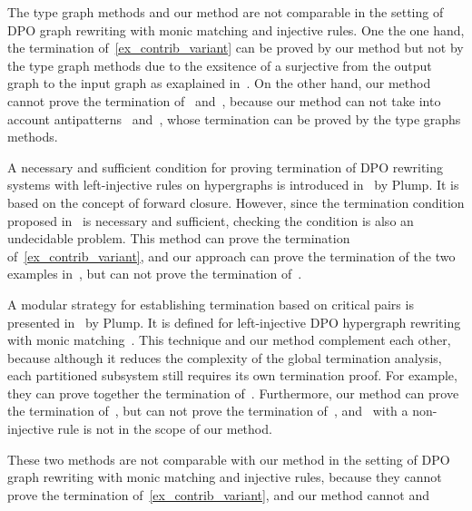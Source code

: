 The type graph methods and our method are not comparable in the setting of DPO graph rewriting with monic matching and injective rules. One the one hand, the termination of~\autoref{ex_contrib_variant} can be proved by our method but not by the type graph methods due to the exsitence of a surjective from the output graph to the input graph as exaplained in~\cite[Example D.4]{endrullis2024generalized_arxiv_v2}. On the other hand, our method cannot prove the termination of~\cite[Example 1, Ad-hoc Routing Protocol]{bruggink2014termination} and~\cite[Example D3]{endrullis2024generalized_arxiv_v2}, because our method can not take into account antipatterns~\cite[Remark 6.2]{overbeek2024termination_lmcs} and~\cite[Examples D1, D2 and D3]{endrullis2024generalized_arxiv_v2}, whose termination can be proved by the type graphs methods.

A necessary and sufficient condition for proving termination of DPO rewriting systems with left-injective rules on hypergraphs is introduced in~\cite{Plump1995} by Plump. It is based on the concept of forward closure. However, since the termination condition proposed in~\cite{Plump1995} is necessary and sufficient, checking the condition is also an undecidable problem. This method can prove the termination of~\autoref{ex_contrib_variant}, and our approach can prove the termination of the two examples in~\cite{Plump1995}, but can not prove the termination of~\cite[Example 4.1]{Plump1995}.

A modular strategy for establishing termination based on critical pairs is presented in~\cite{plump2018modular} by Plump. It is defined for left-injective DPO hypergraph rewriting with monic matching~\cite[Section 2.2]{plump2018modular}. 
This technique and our method complement each other, because although it reduces the complexity of the global termination analysis, each partitioned subsystem still requires its own termination proof. For example, they can prove together the termination of~\cite[Example 4]{plump2018modular}.
Furthermore, our method can prove the termination of~\cite[Examples 1 and 5]{plump2018modular}, but can not prove the termination of~\cite[Example 4]{plump2018modular}, and~\cite[Example 6]{plump2018modular} with a non-injective rule is not in the scope of our method. 

These two methods are not comparable with our method in the setting of DPO graph rewriting with monic matching and injective rules, because they cannot prove the termination of~\autoref{ex_contrib_variant}, and our method cannot   and

